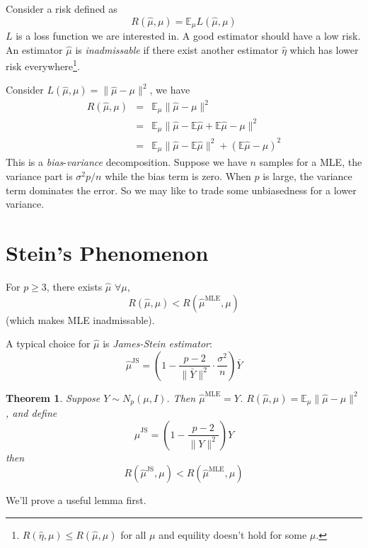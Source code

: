 \documentclass[twoside]{article}
\theoremstyle{plain}
\newtheorem{thm}{Theorem}[section]
\theoremstyle{definition}
\theoremstyle{remark}
\def\E{{\mathbb E}}
\newcommand{\st}{\text{s.t.}}
\def\E{{\mathbb E}}
\begin{document}
Consider a risk defined as
\[ R(\hat{\mu}, \mu) = \E_{\mu} L(\hat{\mu},\mu) \]
$L$ is a loss function we are interested in. A good estimator should 
have a low risk. An estimator $\hat{\mu}$ is \emph{inadmissable} 
if there exist another estimator $\hat{\eta}$ which has lower risk
everywhere\footnote{$R(\hat{\eta},\mu) \le R(\hat{\mu},\mu)$
	for all $\mu$ and equility doesn't hold for some $\mu$.}.

Consider $L(\hat{\mu},\mu) = \lVert \hat{\mu} - \mu \rVert^2$, we have
\begin{eqnarray*}
R(\hat{\mu},\mu) &=& \E_{\mu} \lVert \hat{\mu} - \mu \rVert^2 \\
&=& \E_{\mu} \lVert \hat{\mu} - \E\hat{\mu} + \E\hat{\mu} - \mu \rVert^2 \\
&=& \E_\mu \lVert \hat{\mu} - \E \hat{\mu} \rVert^2 + \left( \E \hat{\mu} - \mu \right)^2
\end{eqnarray*}
This is a \emph{bias}-\emph{variance} decomposition.
Suppose we have $n$ samples for a MLE, the variance part is $\sigma^2 p/n$ 
while the bias term is zero. 
When $p$ is large, the variance term dominates the error.
So we may like to trade some unbiasedness for a lower variance.

\section{Stein's Phenomenon}
	For $p \ge 3$, there exists $\hat{\mu}$ \st $\forall \mu$,
	\[ R(\hat{\mu}, \mu) < R(\hat{\mu}^{\text{MLE}}, \mu) \]
	(which makes MLE inadmissable).

	A typical choice for $\hat{\mu}$ is \emph{James-Stein estimator}:
\[
	\hat{\mu}^{\text{JS}} = \left( 1 - \frac{p-2}{\lVert \bar{Y} \rVert^2} \cdot \frac{\sigma^2}{n} \right) \bar{Y}
\]

\begin{thm}
	Suppose $Y \sim N_p(\mu,I)$. Then $\hat{\mu}^{\text{MLE}} = Y$. 
	$R(\hat{\mu},\mu) = \E_{\mu} \lVert \hat{\mu} - \mu\rVert^2$, and define
	\[ \hat{\mu}^{\text{JS}} = \left(1 - \frac{p-2}{\lVert Y \rVert^2} \right) Y \]
	then
	\[
		R(\hat{\mu}^{\text{JS}}, \mu) < R(\hat{\mu}^{\text{MLE}},\mu) 
	\]
\end{thm}
We'll prove a useful lemma first.
\end{document}
